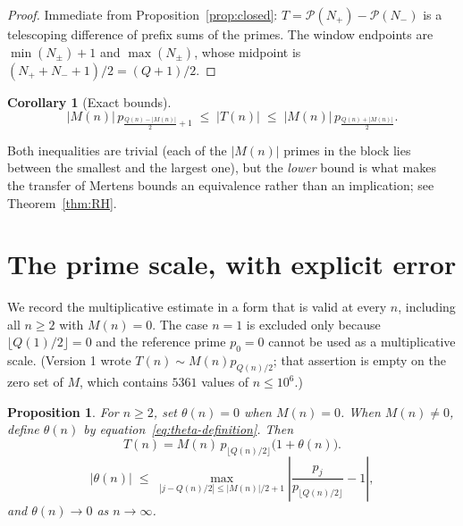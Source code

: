 \documentclass[11pt]{amsart}
\numberwithin{equation}{section}
\theoremstyle{plain}
\newtheorem{proposition}[theorem]{Proposition}
\newtheorem{corollary}[theorem]{Corollary}
\theoremstyle{definition}
\theoremstyle{remark}
\newcommand{\Mert}{M}
\newcommand{\Sq}{Q}
\newcommand{\PS}{\mathcal P}
\begin{document}
\begin{proof}
Immediate from Proposition~\ref{prop:closed}: $T=\PS(N_+)-\PS(N_-)$ is a
telescoping difference of prefix sums of the primes. The window endpoints are
$\min(N_\pm)+1$ and $\max(N_\pm)$, whose midpoint is
$(N_++N_-+1)/2=(\Sq+1)/2$.
\end{proof}

\begin{corollary}[Exact bounds]\label{cor:bounds}
\begin{equation}
\label{eq:block-bounds}
|\Mert(n)|\,p_{\frac{\Sq(n)-|\Mert(n)|}{2}+1}
\;\le\;
|T(n)|
\;\le\;
|\Mert(n)|\,p_{\frac{\Sq(n)+|\Mert(n)|}{2}} .
\end{equation}
\end{corollary}

Both inequalities are trivial (each of the $|\Mert(n)|$ primes in the block lies
between the smallest and the largest one), but the \emph{lower} bound is what
makes the transfer of Mertens bounds an equivalence rather than an implication;
see Theorem~\ref{thm:RH}.

\section{The prime scale, with explicit error}
\label{sec:prime-scale}

We record the multiplicative estimate in a form that is valid at every $n$,
including all $n\ge2$ with $\Mert(n)=0$. The case $n=1$ is excluded only because
$\lfloor\Sq(1)/2\rfloor=0$ and the reference prime $p_0=0$ cannot be used as a
multiplicative scale. (Version 1 wrote
$T(n)\sim \Mert(n)p_{\Sq(n)/2}$; that assertion is empty on the zero set of
$\Mert$, which contains $5361$ values of $n\le10^{6}$.)

\begin{proposition}\label{prop:scale}
For $n\ge2$, set $\theta(n)=0$ when $M(n)=0$. When $M(n)\ne0$, define
$\theta(n)$ by equation~\eqref{eq:theta-definition}. Then
\begin{equation}
\label{eq:theta-definition}
T(n)=M(n)\,p_{\lfloor Q(n)/2\rfloor}\bigl(1+\theta(n)\bigr).
\end{equation}
\begin{equation}
\label{eq:theta-bound}
|\theta(n)|\;\le\;
\max_{|j-\Sq(n)/2|\le |\Mert(n)|/2+1}
\left|\frac{p_j}{p_{\lfloor \Sq(n)/2\rfloor}}-1\right| ,
\end{equation}
and $\theta(n)\to0$ as $n\to\infty$.
\end{proposition}
\end{document}
